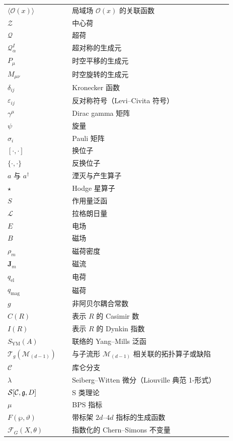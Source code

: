 \begin{longtable}{@{}p{0.27\linewidth}p{0.67\linewidth}@{}}
$\langle\mathcal{O}(x)\rangle$ & 局域场 $\mathcal{O}(x)$ 的关联函数 \\
$\mathcal{Z}$ & 中心荷 \\
$\mathcal{Q}$ & 超荷 \\
$\mathcal{Q}^I_\alpha$ & 超对称的生成元 \\
$P_\mu$ & 时空平移的生成元 \\
$M_{\mu\nu}$ & 时空旋转的生成元 \\
$\delta_{ij}$ & Kronecker 函数 \\
$\varepsilon_{ij}$ & 反对称符号（Levi–Civita 符号） \\
$\gamma^\mu$ & Dirac gamma 矩阵 \\
$\psi$ & 旋量 \\
$\sigma_i$ & Pauli 矩阵 \\
$[\cdot,\cdot]$ & 换位子 \\
$\{\cdot,\cdot\}$ & 反换位子 \\
$a$ 与 $a^{\dagger}$ & 湮灭与产生算子 \\
$\star$ & Hodge 星算子 \\
$S$ & 作用量泛函 \\
$\mathcal{L}$ & 拉格朗日量 \\
$E$ & 电场 \\
$B$ & 磁场 \\
$\rho_m$ & 磁荷密度 \\
$\mathbf{J}_m$ & 磁流 \\
$q_{\mathrm{el}}$ & 电荷 \\
$q_{\mathrm{mag}}$ & 磁荷 \\
$g$ & 非阿贝尔耦合常数 \\
$C(R)$ & 表示 $R$ 的 Casimir 数 \\
$I(R)$ & 表示 $R$ 的 Dynkin 指数 \\
$S_{\mathrm{YM}}(A)$ & 联络的 Yang–Mills 泛函 \\
$\mathcal{T}_g(\mathcal{M}_{(d-1)})$ & 与子流形 $\mathcal{M}_{(d-1)}$ 相关联的拓扑算子或缺陷 \\
$\mathcal{C}$ & 库仑分支 \\
$\lambda$ & Seiberg–Witten 微分（Liouville 典范 1-形式） \\
$\mathcal{S}[\mathcal{C},\mathfrak{g},D]$ & S 类理论 \\
$\mu$ & BPS 指标 \\
$F(\wp,\vartheta)$ & 带标架 $2d$–$4d$ 指标的生成函数 \\
$\mathcal{F}_G(X,\theta)$ & 指数化的 Chern–Simons 不变量 \\

\end{longtable}
